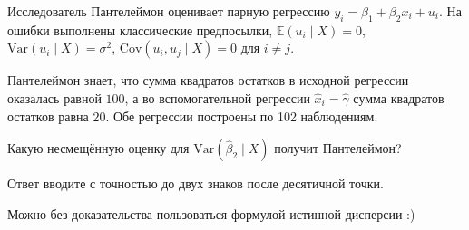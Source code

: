 
\begin{question}
Исследователь Пантелеймон оценивает парную регрессию \(y_i = \beta_1 + \beta_2 x_i + u_i\).
На ошибки выполнены классические предпосылки, \(\mathbb E(u_i \mid X) = 0\), \(\mathrm{Var}(u_i \mid X) = \sigma^2\),
\(\mathrm{Cov}(u_i, u_j \mid X) = 0\) для \(i\neq j\).

Пантелеймон знает, что сумма квадратов остатков в исходной регрессии оказалась равной \(100\), а во вспомогательной регрессии
\(\hat x_i = \hat \gamma\) сумма квадратов остатков равна \(20\). Обе регрессии построены по 102 наблюдениям.

Какую несмещённую оценку для \(\mathrm{Var}(\hat\beta_2 \mid X)\) получит Пантелеймон?

Ответ вводите с точностью до двух знаков после десятичной точки.
\end{question}

\begin{solution}
Можно без доказательства пользоваться формулой истинной дисперсии :)
\end{solution}

